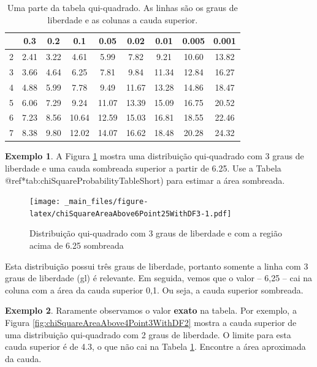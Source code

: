 \documentclass[
]{book}
\theoremstyle{definition}
\theoremstyle{definition}
\newtheorem{example}{Exemplo}[chapter]
\theoremstyle{definition}
\theoremstyle{definition}
\theoremstyle{remark}
\begin{document}
\begin{table}

\caption{\label{tab:chiSquareProbabilityTableShort}Uma parte da tabela qui-quadrado. As linhas são os graus de liberdade e as colunas a cauda superior.}
\centering
\begin{tabular}[t]{l|c|c|c|c|c|c|c|c}
\hline
  & 0.3 & 0.2 & 0.1 & 0.05 & 0.02 & 0.01 & 0.005 & 0.001\\
\hline
2 & 2.41 & 3.22 & 4.61 & 5.99 & 7.82 & 9.21 & 10.60 & 13.82\\
\hline
3 & 3.66 & 4.64 & 6.25 & 7.81 & 9.84 & 11.34 & 12.84 & 16.27\\
\hline
4 & 4.88 & 5.99 & 7.78 & 9.49 & 11.67 & 13.28 & 14.86 & 18.47\\
\hline
5 & 6.06 & 7.29 & 9.24 & 11.07 & 13.39 & 15.09 & 16.75 & 20.52\\
\hline
6 & 7.23 & 8.56 & 10.64 & 12.59 & 15.03 & 16.81 & 18.55 & 22.46\\
\hline
7 & 8.38 & 9.80 & 12.02 & 14.07 & 16.62 & 18.48 & 20.28 & 24.32\\
\hline
\end{tabular}
\end{table}

\begin{example}
\protect\hypertarget{exm:unnamed-chunk-238}{}{\label{exm:unnamed-chunk-238} }A Figura \ref{fig:chiSquareAreaAbove6Point25WithDF3} mostra uma distribuição qui-quadrado com 3 graus de liberdade e uma cauda sombreada superior a partir de 6.25. Use a Tabela @ref*tab:chiSquareProbabilityTableShort) para estimar a área sombreada.
\end{example}

\begin{figure}
\centering
\texttt{[image: \_main\_files/figure-latex/chiSquareAreaAbove6Point25WithDF3-1.pdf]}
\caption{\label{fig:chiSquareAreaAbove6Point25WithDF3}Distribuição qui-quadrado com 3 graus de liberdade e com a região acima de 6.25 sombreada}
\end{figure}

Esta distribuição possui três graus de liberdade, portanto somente a linha com 3 graus de liberdade (gl) é relevante. Em seguida, vemos que o valor -- 6,25 -- cai na coluna com a área da cauda superior 0,1. Ou seja, a cauda superior sombreada.

\begin{example}
\protect\hypertarget{exm:unnamed-chunk-239}{}{\label{exm:unnamed-chunk-239} }Raramente observamos o valor \textbf{exato} na tabela. Por exemplo, a Figura \ref{fig:chiSquareAreaAbove4Point3WithDF2} mostra a cauda superior de uma distribuição qui-quadrado com 2 graus de liberdade. O limite para esta cauda superior é de 4.3, o que não cai na Tabela \ref{tab:chiSquareProbabilityTableShort}. Encontre a área aproximada da cauda.
\end{example}
\end{document}
